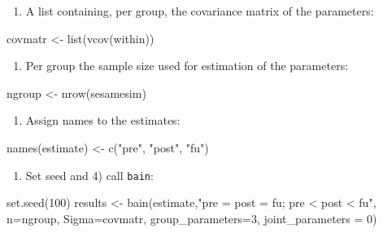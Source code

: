 \documentclass[
]{book}
\newenvironment{Shaded}{\begin{snugshade}}{\end{snugshade}}
\newcommand{\AttributeTok}[1]{\textcolor[rgb]{0.77,0.63,0.00}{#1}}
\newcommand{\DecValTok}[1]{\textcolor[rgb]{0.00,0.00,0.81}{#1}}
\newcommand{\FunctionTok}[1]{\textcolor[rgb]{0.00,0.00,0.00}{#1}}
\newcommand{\NormalTok}[1]{#1}
\newcommand{\OtherTok}[1]{\textcolor[rgb]{0.56,0.35,0.01}{#1}}
\newcommand{\StringTok}[1]{\textcolor[rgb]{0.31,0.60,0.02}{#1}}
\providecommand{\tightlist}{%
  \setlength{\itemsep}{0pt}\setlength{\parskip}{0pt}}
\begin{document}
\begin{enumerate}
\def\labelenumi{\alph{enumi})}
\setcounter{enumi}{1}
\tightlist
\item
  A list containing, per group, the covariance
  matrix of the parameters:
\end{enumerate}

\begin{Shaded}
\begin{Highlighting}[]
\NormalTok{covmatr }\OtherTok{\textless{}{-}} \FunctionTok{list}\NormalTok{(}\FunctionTok{vcov}\NormalTok{(within))}
\end{Highlighting}
\end{Shaded}

\begin{enumerate}
\def\labelenumi{\alph{enumi})}
\setcounter{enumi}{2}
\tightlist
\item
  Per group the sample size used for estimation of the parameters:
\end{enumerate}

\begin{Shaded}
\begin{Highlighting}[]
\NormalTok{ngroup }\OtherTok{\textless{}{-}} \FunctionTok{nrow}\NormalTok{(sesamesim)}
\end{Highlighting}
\end{Shaded}

\begin{enumerate}
\def\labelenumi{\arabic{enumi})}
\setcounter{enumi}{1}
\tightlist
\item
  Assign names to the estimates:
\end{enumerate}

\begin{Shaded}
\begin{Highlighting}[]
\FunctionTok{names}\NormalTok{(estimate) }\OtherTok{\textless{}{-}} \FunctionTok{c}\NormalTok{(}\StringTok{"pre"}\NormalTok{, }\StringTok{"post"}\NormalTok{, }\StringTok{"fu"}\NormalTok{)}
\end{Highlighting}
\end{Shaded}

\begin{enumerate}
\def\labelenumi{\arabic{enumi})}
\setcounter{enumi}{2}
\tightlist
\item
  Set seed and 4) call \texttt{bain}:
\end{enumerate}

\begin{Shaded}
\begin{Highlighting}[]
\FunctionTok{set.seed}\NormalTok{(}\DecValTok{100}\NormalTok{)}
\NormalTok{results }\OtherTok{\textless{}{-}} \FunctionTok{bain}\NormalTok{(estimate,}\StringTok{"pre = post = fu; pre \textless{} post \textless{} fu"}\NormalTok{, }\AttributeTok{n=}\NormalTok{ngroup,}
\AttributeTok{Sigma=}\NormalTok{covmatr, }\AttributeTok{group\_parameters=}\DecValTok{3}\NormalTok{, }\AttributeTok{joint\_parameters =} \DecValTok{0}\NormalTok{)}
\end{Highlighting}
\end{Shaded}
\end{document}
